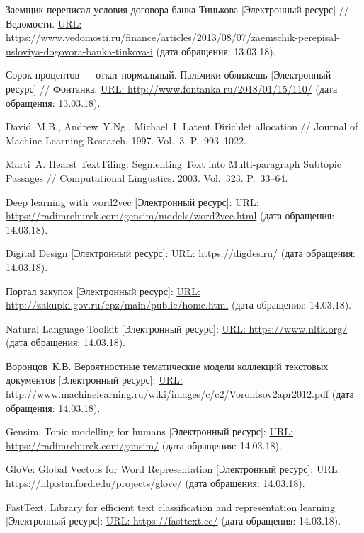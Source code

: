 \documentclass[12pt]{article}
\begin{document}
\begin{thebibliography}{99}
\vspace{-7pt}

 Заемщик переписал условия договора банка Тинькова [Электронный ресурс] // Ведомости.  \url{URL: https://www.vedomosti.ru/finance/articles/2013/08/07/zaemschik-perepisal-usloviya-dogovora-banka-tinkova-i} (дата обращения: 13.03.18).

 Сорок процентов --- откат нормальный. Пальчики оближешь [Электронный ресурс] // Фонтанка.  \url{URL: http://www.fontanka.ru/2018/01/15/110/} (дата обращения: 13.03.18).

 David~M.\:B., Andrew~Y.\:Ng., Michael~I. Latent Dirichlet allocation // Journal of Machine Learning Research. 1997. Vol.~3. P.~993--1022.

 Marti~A. Hearst TextTiling: Segmenting Text into Multi-paragraph Subtopic Passages // Computational Lingustics. 2003. Vol.~323. P.~33--64.

 Deep learning with word2vec [Электронный ресурс]: \url{URL: https://radimrehurek.com/gensim/models/word2vec.html} (дата обращения: 14.03.18).

  Digital Design [Электронный ресурс]: \url{URL: https://digdes.ru/} (дата обращения: 14.03.18).

 Портал закупок [Электронный ресурс]: \url{URL: http://zakupki.gov.ru/epz/main/public/home.html} (дата обращения: 14.03.18).

 Natural Language Toolkit [Электронный ресурс]: \url{URL: https://www.nltk.org/} (дата обращения: 14.03.18).

 Воронцов~К.\:В. Вероятностные тематические модели коллекций текстовых документов [Электронный ресурс]: \url{URL:  http://www.machinelearning.ru/wiki/images/c/c2/Vorontsov2apr2012.pdf} (дата обращения: 14.03.18).

  Gensim. Topic modelling for humans [Электронный ресурс]: \url{URL: https://radimrehurek.com/gensim/} (дата обращения: 14.03.18).

  GloVe: Global Vectors for Word Representation [Электронный ресурс]: \url{URL: https://nlp.stanford.edu/projects/glove/} (дата обращения: 14.03.18).

  FastText. Library for efficient text classification and representation learning [Электронный ресурс]: \url{URL: https://fasttext.cc/} (дата обращения: 14.03.18).


\end{thebibliography}
\end{document}
